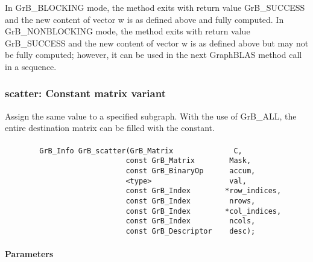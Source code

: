In {\sf GrB\_BLOCKING} mode, the method exits with return value 
{\sf GrB\_SUCCESS} and the new content of vector {\sf w} is as defined above
and fully computed.  
In {\sf GrB\_NONBLOCKING} mode, the method exits with return value 
{\sf GrB\_SUCCESS} and the new content of vector {\sf w} is as defined above 
but may not be fully computed; however, it can be used in the next GraphBLAS 
method call in a sequence.



\subsubsection{{\sf scatter}: Constant matrix variant}

Assign the same value to a specified subgraph.  With the use of {\sf GrB\_ALL}, 
the entire destination matrix can be filled with the constant.

\paragraph{\syntax}

\begin{verbatim}
        GrB_Info GrB_scatter(GrB_Matrix              C,
                            const GrB_Matrix        Mask,
                            const GrB_BinaryOp      accum,
                            <type>                  val,
                            const GrB_Index        *row_indices,
                            const GrB_Index         nrows,
                            const GrB_Index        *col_indices,
                            const GrB_Index         ncols,
                            const GrB_Descriptor    desc);
\end{verbatim}

\paragraph{Parameters}

